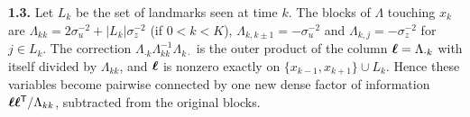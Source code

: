 \textbf{1.3.} Let $L_k$ be the set of landmarks seen at time $k$. The
blocks of $\Lambda$ touching $x_k$ are $\Lambda_{kk}=2\sigma_u^{-2}+
|L_k|\sigma_z^{-2}$ (if $0<k<K$), $\Lambda_{k,k\pm1}=-\sigma_u^{-2}$ and
$\Lambda_{k,j}=-\sigma_z^{-2}$ for $j\in L_k$. The correction
$\Lambda_{\cdot k}\Lambda_{kk}^{-1}\Lambda_{k\cdot}$ is the outer product
of the column $\bm{\ell}=\Lambda_{\cdot k}$ with itself divided by
$\Lambda_{kk}$, and $\bm{\ell}$ is nonzero exactly on
$\{x_{k-1},x_{k+1}\}\cup L_k$. Hence these variables become pairwise
connected by one new dense factor of information
$\bm{\ell}\bm{\ell}^{\mathsf{T}}/\Lambda_{kk}$, subtracted from the original
blocks.
